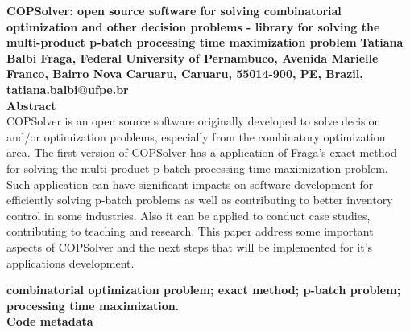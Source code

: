 \documentclass[11pt, letterpaper]{article}
\begin{document}
\noindent
\textbf{COPSolver: open source software for solving combinatorial optimization and other decision problems - library for solving the multi-product p-batch processing time maximization problem}
\vskip0.5cm
\noindent
\textbf{Tatiana Balbi Fraga, Federal University of Pernambuco, Avenida Marielle
Franco, Bairro Nova Caruaru, Caruaru, 55014-900, PE, Brazil, tatiana.balbi@ufpe.br}\\

\noindent
\textbf{Abstract}\\
COPSolver is an open source software originally developed to solve decision and/or optimization problems, especially from the combinatory optimization area. The first version of COPSolver has a application of Fraga's exact method for solving the multi-product p-batch processing time maximization problem. Such application can have significant impacts on software development for efficiently solving p-batch problems as well as contributing to better inventory control in some industries. Also it can be applied to conduct case studies, contributing to teaching and research. This paper address some important aspects of COPSolver and the next steps that will be implemented for it's applications development.
\vskip0.5cm

\noindent
\textbf{combinatorial optimization problem; exact method; p-batch problem; processing time maximization.}\\
\vskip0.5cm
\newpage
\noindent
\textbf{Code metadata}\\
\end{document}
